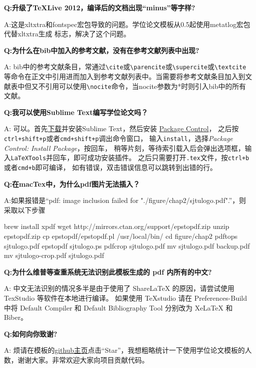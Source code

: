 {\bfseries{}Q:升级了TeXLive 2012，编译后的文档出现“minus”等字样?}

A:这是xltxtra和fontspec宏包导致的问题。学位论文模板从0.5起使用metatlog宏包代替xltxtra生成 \XeTeX 标志，解决了这个问题。

{\bfseries{}Q:为什么在bib中加入的参考文献，没有在参考文献列表中出现?}

A: bib中的参考文献条目，常通过\verb+\cite+或\verb+\parencite+或\verb+\supercite+或\verb+\textcite+等命令在正文中引用进而加入到参考文献列表中。当需要将参考文献条目加入到文献表中但又不引用可以使用\verb+\nocite+命令，当nocite参数为*时则引入bib中的所有文献。

{\bfseries{}Q:我可以使用Sublime Text编写学位论文吗？}

A: 可以。首先\href{https://www.sublimetext.com/}{下载}并安装Sublime Text，然后安装
\href{https://packagecontrol.io/installation}{Package Control}，
之后按\verb|ctrl+shift+p|或者\verb|cmd+shift+p|调出命令窗口，
输入\verb|install|，选择\textit{Package Control: Install Package}，按回车，
稍等片刻，等待索引载入后会弹出选项框，输入\verb|LaTeXTools|并回车，即可成功安装插件。
之后只需要打开\verb|.tex|文件，按\verb|ctrl+b|或者\verb|cmd+b|即可编译，
如有错误，双击错误信息可以跳转到出错的行。

{\bfseries{}Q:在macTex中，为什么pdf图片无法插入？}

A:如果报错是“pdf: image inclusion failed for "./figure/chap2/sjtulogo.pdf".”，则采取以下步骤

\begin{codeblock}[sh]
brew install xpdf
wget http://mirrors.ctan.org/support/epstopdf.zip
unzip epstopdf.zip
cp epstopdf/epstopdf.pl /usr/local/bin/
cd figure/chap2
pdftops sjtulogo.pdf
epstopdf sjtulogo.ps
pdfcrop sjtulogo.pdf
mv sjtulogo.pdf backup.pdf
mv sjtulogo-crop.pdf sjtulogo.pdf
\end{codeblock}

{\bfseries{}Q:为什么维普等查重系统无法识别此模板生成的 pdf 内所有的中文?}

A: 中文无法识别的情况多半是由于使用了 ShareLaTeX 的原因，请尝试使用 TexStudio 等软件在本地进行编译。
如果使用 TeXstudio 请在 Preferences-Build 中将 Default Compiler 和 Default Bibliography Tool 分别改为 XeLaTeX 和 Biber。

{\bfseries{}Q:如何向你致谢?}

A: 烦请在模板的\href{https://github.com/sjtug/SJTUThesis}{github主页}点击“Star”，我想粗略统计一下使用学位论文模板的人数，谢谢大家。非常欢迎大家向项目贡献代码。
